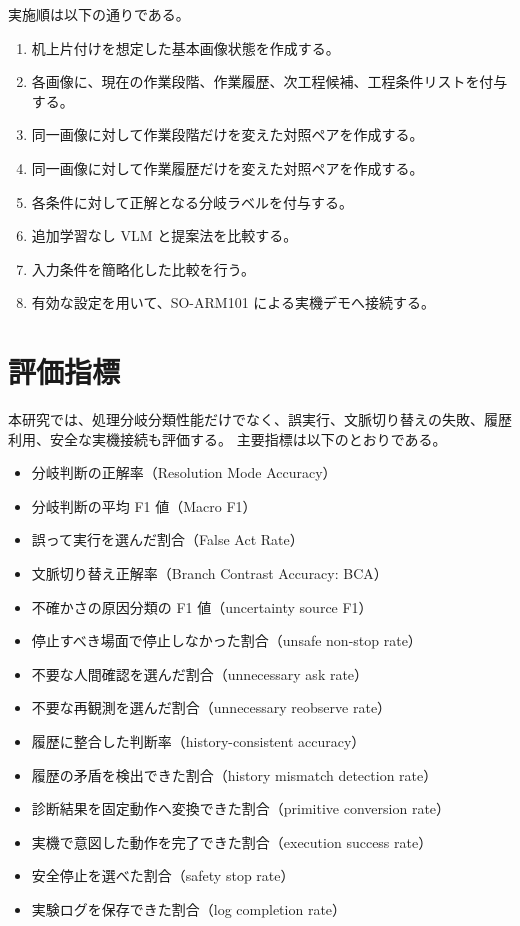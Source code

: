 実施順は以下の通りである。
\begin{enumerate}
\item 机上片付けを想定した基本画像状態を作成する。
\item 各画像に、現在の作業段階、作業履歴、次工程候補、工程条件リストを付与する。
\item 同一画像に対して作業段階だけを変えた対照ペアを作成する。
\item 同一画像に対して作業履歴だけを変えた対照ペアを作成する。
\item 各条件に対して正解となる分岐ラベルを付与する。
\item 追加学習なし VLM と提案法を比較する。
\item 入力条件を簡略化した比較を行う。
\item 有効な設定を用いて、SO-ARM101 による実機デモへ接続する。
\end{enumerate}

\section{評価指標}

本研究では、処理分岐分類性能だけでなく、誤実行、文脈切り替えの失敗、履歴利用、安全な実機接続も評価する。
主要指標は以下のとおりである。

\begin{itemize}
\item 分岐判断の正解率（Resolution Mode Accuracy）
\item 分岐判断の平均 F1 値（Macro F1）
\item 誤って実行を選んだ割合（False Act Rate）
\item 文脈切り替え正解率（Branch Contrast Accuracy: BCA）
\item 不確かさの原因分類の F1 値（uncertainty source F1）
\item 停止すべき場面で停止しなかった割合（unsafe non-stop rate）
\item 不要な人間確認を選んだ割合（unnecessary ask rate）
\item 不要な再観測を選んだ割合（unnecessary reobserve rate）
\item 履歴に整合した判断率（history-consistent accuracy）
\item 履歴の矛盾を検出できた割合（history mismatch detection rate）
\item 診断結果を固定動作へ変換できた割合（primitive conversion rate）
\item 実機で意図した動作を完了できた割合（execution success rate）
\item 安全停止を選べた割合（safety stop rate）
\item 実験ログを保存できた割合（log completion rate）
\end{itemize}

